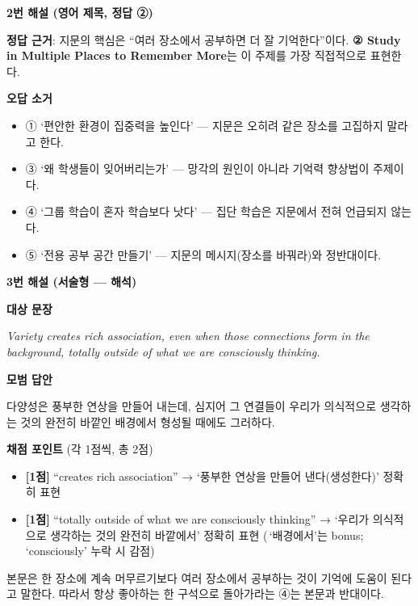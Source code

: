 \documentclass[11pt,a4paper]{article}
\begin{document}
\bigskip

{\sffamily\bfseries 2번 해설 (영어 제목, 정답 ②)}

\medskip
\begin{pbox}
\textbf{정답 근거}: 지문의 핵심은 ``여러 장소에서 공부하면 더 잘 기억한다''이다.
\textbf{② Study in Multiple Places to Remember More}는 이 주제를 가장 직접적으로 표현한다.
\end{pbox}

\medskip
\textbf{오답 소거}
\begin{itemize}[leftmargin=2em,itemsep=1pt]
  \item ① `편안한 환경이 집중력을 높인다' — 지문은 오히려 같은 장소를 고집하지 말라고 한다.
  \item ③ `왜 학생들이 잊어버리는가' — 망각의 원인이 아니라 기억력 향상법이 주제이다.
  \item ④ `그룹 학습이 혼자 학습보다 낫다' — 집단 학습은 지문에서 전혀 언급되지 않는다.
  \item ⑤ `전용 공부 공간 만들기' — 지문의 메시지(장소를 바꿔라)와 정반대이다.
\end{itemize}

\bigskip

{\sffamily\bfseries 3번 해설 (서술형 — 해석)}

\medskip
\textbf{대상 문장}

\begin{pbox}
\itshape
Variety creates rich association, even when those connections form in the
background, totally outside of what we are consciously thinking.
\end{pbox}

\medskip
\textbf{모범 답안}

\begin{pbox}
다양성은 풍부한 연상을 만들어 내는데, 심지어 그 연결들이 우리가 의식적으로 생각하는 것의
완전히 바깥인 배경에서 형성될 때에도 그러하다.
\end{pbox}

\medskip
\textbf{채점 포인트} (각 1점씩, 총 2점)
\begin{itemize}[leftmargin=2em,itemsep=1pt]
  \item \textbf{[1점]} ``creates rich association'' → `풍부한 연상을 만들어 낸다(생성한다)' 정확히 표현
  \item \textbf{[1점]} ``totally outside of what we are consciously thinking'' →
        `우리가 의식적으로 생각하는 것의 완전히 바깥에서' 정확히 표현
        (\,`배경에서'는 bonus; `consciously' 누락 시 감점)
\end{itemize}

\vspace{8pt}
\par 본문은 한 장소에 계속 머무르기보다 여러 장소에서 공부하는 것이 기억에 도움이 된다고 말한다. 따라서 항상 좋아하는 한 구석으로 돌아가라는 ④는 본문과 반대이다.
\end{document}
